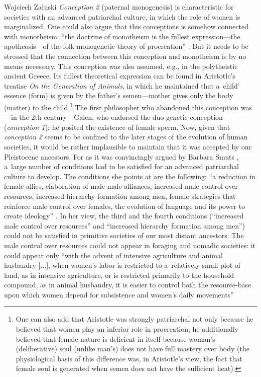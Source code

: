 \begin{artengenv}{Wojciech Załuski}
\textit{Conception 2} (paternal monogenesis) is characteristic for societies with an advanced patriarchal culture, in which the role of women is marginalized. One could also argue that this conceptions is somehow connected with monotheism: ``the doctrine of monotheism is the fullest expression---the apotheosis---of the folk monogenetic theory of procreation''
\parencite[][p.502]{delaney_meaning_1986}. %
 But it needs to be stressed that the connection between this conception and monotheism is by no means necessary. This conception was also assumed, e.g., in the polytheistic ancient Greece. Its fullest theoretical expression can be found in Aristotle's treatise \textit{On the Generation of Animals}, in which he maintained that a~child' essence (form) is given by the father's semen---mother gives only the body (matter) to the child.\footnote{One can also add that Aristotle was strongly patriarchal not only because he believed that women play an inferior role in procreation; he additionally believed that female nature is deficient in itself because woman's (deliberative) soul (unlike man's) does not have full mastery over body (the physiological basis of this difference was, in Aristotle's view, the fact that female soul is generated when semen does not have the sufficient heat).} The first philosopher who abandoned this conception was---in the 2th century---Galen, who endorsed the duo-genetic conception (\textit{conception 1}): he posited the existence of female sperm. Now, given that \textit{conception 2} seems to be confined to the later stages of the evolution of human societies, it would be rather implausible to maintain that it was accepted by our Pleistocene ancestors. For as it was convincingly argued by Barbara Smuts 
\parencite*[][]{smuts_evolutionary_1995}, %
 a~large number of conditions had to be satisfied for an advanced patriarchal culture to develop. The conditions she points at are the following: ``a reduction in female allies, elaboration of male-male alliances, increased male control over resources, increased hierarchy formation among men, female strategies that reinforce male control over females, the evolution of language and its power to create ideology'' 
\parencite[][p.20]{smuts_evolutionary_1995}. %
 In her view, the third and the fourth conditions (``increased male control over resources'' and ``increased hierarchy formation among men'') could not be satisfied in primitive societies of our most distant ancestors. The male control over resources could not appear in foraging and nomadic societies: it could appear only ``with the advent of intensive agriculture and animal husbandry [...], when women's labor is restricted to a~relatively small plot of land, as in intensive agriculture, or is restricted primarily to the household compound, as in animal husbandry, it is easier to control both the resource-base upon which women depend for subsistence and women's daily movements'' 

\end{artengenv}
